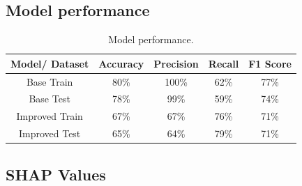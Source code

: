 \documentclass[fleqn,10pt]{wlscirep}
\begin{document}
\subsection{Model performance}

\begin{table}[!htb]
\centering
\begin{tabular}{|c|c|c|c|c|}
\hline

\textbf{Model/ Dataset} & \textbf{Accuracy} & \textbf{Precision} & \textbf{Recall} & \textbf{F1 Score} \\ \hline
     Base Train &     80\% &     100\% &   62\% &     77\% \\
      Base Test &     78\% &     99\% &   59\% &     74\% \\
Improved Train &     67\% &      67\% &   76\% &     71\% \\
 Improved Test &     65\% &      64\% &   79\% &     71\% \\

\hline
\end{tabular}
\caption{Model performance.}
\end{table}


\subsection{SHAP Values}
\end{document}

